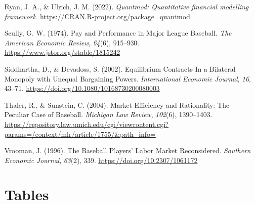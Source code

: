 \documentclass[
  12pt,
  letterpaper,
  DIV=11,
  numbers=noendperiod]{scrartcl}
\newlength{\cslhangindent}
\newlength{\cslentryspacingunit} %
\newenvironment{CSLReferences}[2] %
 {%
  \setlength{\parindent}{0pt}
  \ifodd #1
  \let\oldpar\par
  \def\par{\hangindent=\cslhangindent\oldpar}
  \fi
  \setlength{\parskip}{#2\cslentryspacingunit}
 }%
 {}
\begin{document}
\begin{CSLReferences}{1}{0}
\leavevmode{}%
Ryan, J. A., \& Ulrich, J. M. (2022). \emph{Quantmod: Quantitative
financial modelling framework}.
\url{https://CRAN.R-project.org/package=quantmod}

\leavevmode{}%
Scully, G. W. (1974). Pay and {Performance} in {Major} {League}
{Baseball}. \emph{The American Economic Review}, \emph{64}(6), 915--930.
\url{https://www.jstor.org/stable/1815242}

\leavevmode{}%
Siddhartha, D., \& Devadoss, S. (2002). Equilibrium {Contracts} {In} a
{Bilateral} {Monopoly} with {Unequal} {Bargaining} {Powers}.
\emph{International Economic Journal}, \emph{16}, 43--71.
\url{https://doi.org/10.1080/10168730200080003}

\leavevmode{}%
Thaler, R., \& Sunstein, C. (2004). Market {Efficiency} and
{Rationality}: {The} {Peculiar} {Case} of {Baseball}. \emph{Michigan Law
Review}, \emph{102}(6), 1390--1403.
\url{https://repository.law.umich.edu/cgi/viewcontent.cgi?params=/context/mlr/article/1755/\&path_info=}

\leavevmode{}%
Vrooman, J. (1996). The {Baseball} {Players}' {Labor} {Market}
{Reconsidered}. \emph{Southern Economic Journal}, \emph{63}(2), 339.
\url{https://doi.org/10.2307/1061172}

\end{CSLReferences}

\hypertarget{tables}{%
\section{Tables}\label{tables}}
\end{document}
